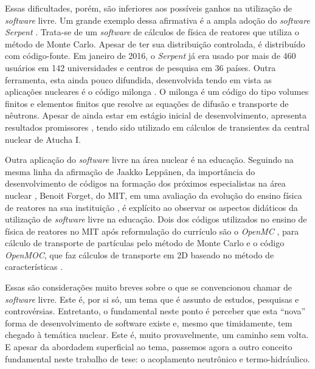 Essas dificultades, porém, são inferiores aos possíveis ganhos na utilização de
\textit{software} livre. Um grande exemplo dessa afirmativa é a ampla adoção
do \textit{software Serpent} \cite{Serpent2013}. Trata-se de um \textit{software}
de cálculos de física de reatores que utiliza o método de Monte Carlo. Apesar
de ter sua distribuição controlada, é distribuído com código-fonte. Em janeiro
de 2016, o \textit{Serpent} já era usado por mais de 460 usuários em 142 universidades
e centros de pesquisa em 36 países. Outra ferramenta, esta ainda pouco difundida,
desenvolvida tendo em vista as aplicações nucleares é o código milonga \cite{Theler2015}.
O milonga é um código do tipo volumes finitos e elementos finitos que resolve as equações
de difusão e transporte de nêutrons. Apesar de ainda estar em estágio inicial de
desenvolvimento, apresenta resultados promissores \cite{Theler2014b}, tendo sido
utilizado em cálculos de transientes da central nuclear de Atucha I.

Outra aplicação do \textit{software} livre na área nuclear é na educação. Seguindo na
mesma linha da afirmação de Jaakko Leppänen, da importância do desenvolvimento de
códigos na formação dos próximos especialistas na área nuclear \cite{Leppanen2015}, Benoit
Forget, do MIT, em uma avaliação da evolução do ensino física de reatores na sua instituição \cite{Forget2014}, é explícito ao observar os aspectos didáticos da
utilização de \textit{software} livre na educação. Dois dos códigos utilizados
no ensino de física de reatores no MIT após reformulação do currículo são o \textit{OpenMC}
\cite{Romano2013}, para cálculo de transporte de partículas pelo método de Monte Carlo e
o código \textit{OpenMOC}, que faz cálculos de transporte em 2D baseado
no método de características \cite{Boyd2014}.

Essas são considerações muito breves sobre o que se convencionou chamar
de \textit{software} livre. Este é, por si só, um tema que é assunto de estudos, pesquisas
e controvérsias. Entretanto, o fundamental neste ponto é perceber que esta ``nova'' forma
de desenvolvimento de software existe e, mesmo que timidamente, tem chegado à temática
nuclear. Este é, muito provavelmente, um caminho sem volta. E apesar da abordadem
superficial ao tema, passemos agora a outro conceito fundamental neste trabalho
de tese: o acoplamento neutrônico e termo-hidráulico.

